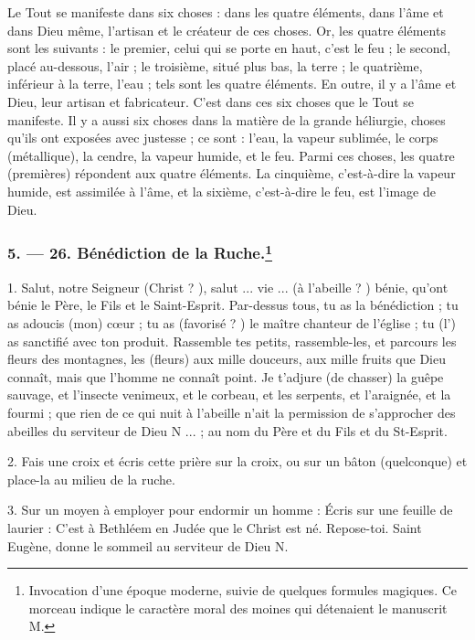 \documentclass[a4paper, 11pt, oneside, polutonikogreek, french]{article}
\begin{document}
Le Tout se manifeste dans six choses : dans les quatre éléments, dans l'âme et dans Dieu même, l'artisan et le créateur de ces choses. Or, les quatre éléments sont les suivants : le premier, celui qui se porte en haut, c'est le feu ; le second, placé au-dessous, l'air ; le troisième, situé plus bas, la terre ; le quatrième, inférieur à la terre, l'eau ; tels sont les quatre éléments. En outre, il y a l'âme et Dieu, leur artisan et fabricateur. C'est dans ces six choses que le Tout se manifeste. Il y a aussi six choses dans la matière de la grande héliurgie, choses qu'ils ont exposées avec justesse ; ce sont : l'eau, la vapeur sublimée, le corps (métallique), la cendre, la vapeur humide, et le feu. Parmi ces choses, les quatre (premières) répondent aux quatre éléments. La cinquième, c'est-à-dire la vapeur humide, est assimilée à l'âme, et la sixième, c'est-à-dire le feu, est l'image de Dieu.

\bigskip
\centerline{\EightStarTaper}
\centerline{\EightStarTaper\EightStarTaper}
\bigskip

\subsubsection[5. --- 26. Bénédiction de la Ruche.]{5. --- 26. Bénédiction de la Ruche.\footnote{Invocation d'une époque moderne, suivie de quelques formules magiques. Ce morceau indique le caractère moral des moines qui détenaient le manuscrit M.}}

1. Salut, notre Seigneur (Christ ? ), salut ... vie ... (à l'abeille ? ) bénie, qu'ont bénie le Père, le Fils et le Saint-Esprit. Par-dessus tous, tu as la bénédiction ; tu as adoucis (mon) cœur ; tu as (favorisé ? ) le maître chanteur de l'église ; tu (l') as sanctifié avec ton produit. Rassemble tes petits, rassemble-les, et parcours les fleurs des montagnes, les (fleurs) aux mille douceurs, aux mille fruits que Dieu connaît, mais que l'homme ne connaît point. Je t'adjure (de chasser) la guêpe sauvage, et l'insecte venimeux, et le corbeau, et les serpents, et l'araignée, et la fourmi ; que rien de ce qui nuit à l'abeille n'ait la permission de s'approcher des abeilles du serviteur de Dieu N ... ; au nom du Père et du Fils et du St-Esprit.

2. Fais une croix et écris cette prière sur la croix, ou sur un bâton (quelconque) et place-la au milieu de la ruche.

3. Sur un moyen à employer pour endormir un homme : Écris sur une feuille de laurier : C'est à Bethléem en Judée que le Christ est né. Repose-toi. Saint Eugène, donne le sommeil au serviteur de Dieu N.
\end{document}
